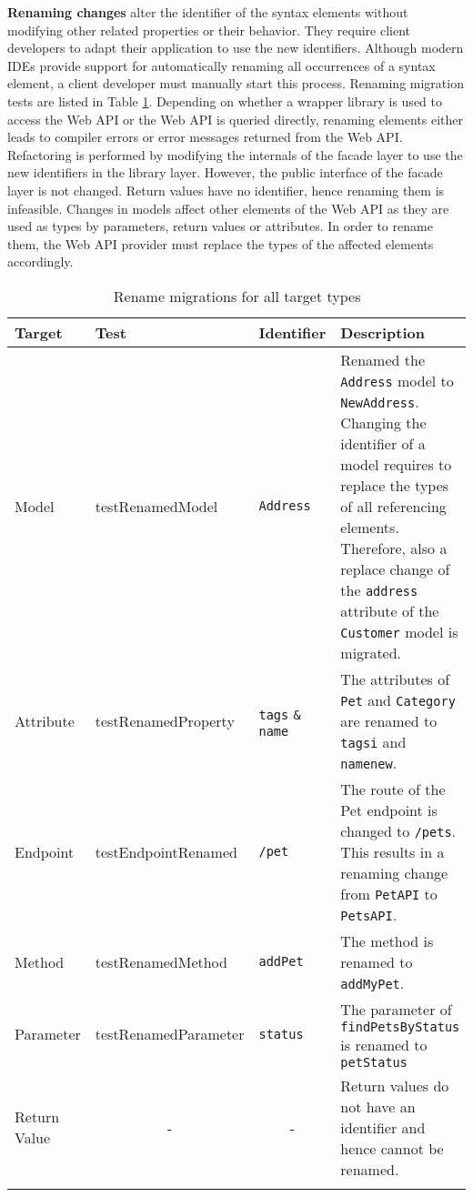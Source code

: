 \textbf{Renaming changes} alter the identifier of the syntax elements without modifying other related properties or their behavior. They require client developers to adapt their application to use the new identifiers. Although modern \acp{IDE} provide support for automatically renaming all occurrences of a syntax element, a client developer must manually start this process. Renaming migration tests are listed in Table \ref{tab:RenameMigrationTests}. Depending on whether a wrapper library is used to access the Web API or the Web API is queried directly, renaming elements either leads to compiler errors or error messages returned from the Web API. Refactoring is performed by modifying the internals of the facade layer to use the new identifiers in the library layer. However, the public interface of the facade layer is not changed. Return values have no identifier, hence renaming them is infeasible. Changes in models affect other elements of the Web API as they are used as types by parameters, return values or attributes. In order to rename them, the Web API provider must replace the types of the affected elements accordingly. 

	\begin{center}
		\begin{longtable}{@{}lp{}lp{}@{}}
			\toprule
		\textbf{Target} & \textbf{Test} & \textbf{Identifier} & \textbf{Description} \\ \midrule \endhead
			Model           &   test\-Renamed\-Model  &    \texttt{Address}     &   Renamed the \texttt{Address} model to \texttt{NewAddress}. Changing the identifier of a model requires to replace the types of all referencing elements. Therefore, also a replace change of the \texttt{address} attribute of the \texttt{Customer} model is migrated.    \\
			Attribute       &   test\-Renamed\-Property   &  \texttt{tags} \texttt{\&} \texttt{name}      &      The attributes of  \texttt{Pet} and \texttt{Category} are renamed to \texttt{tagsi} and \texttt{namenew}.    \\
			Endpoint        &     test\-Endpoint\-Renamed  &    \texttt{/pet}     &   The route of the Pet endpoint is changed to \texttt{/pets}. This results in a renaming change from \texttt{PetAPI} to \texttt{PetsAPI}.     \\
			Method        &     test\-Renamed\-Method     &    \texttt{addPet}    &           The method is renamed to \texttt{addMyPet}.                            \\
			Parameter       &               test\-Renamed\-Parameter                    &    \texttt{status}       &       The parameter of \texttt{findPetsByStatus}  is renamed to \texttt{petStatus}        \\
			Return Value    &            \multicolumn{1}{c}{-}  &    \multicolumn{1}{c}{-}                   &      Return values do not have an identifier and hence cannot be renamed.         \\ \bottomrule
					\caption{Rename migrations for all target types}
			\label{tab:RenameMigrationTests}
		\end{longtable}
	\end{center}
\vspace{-1cm}

